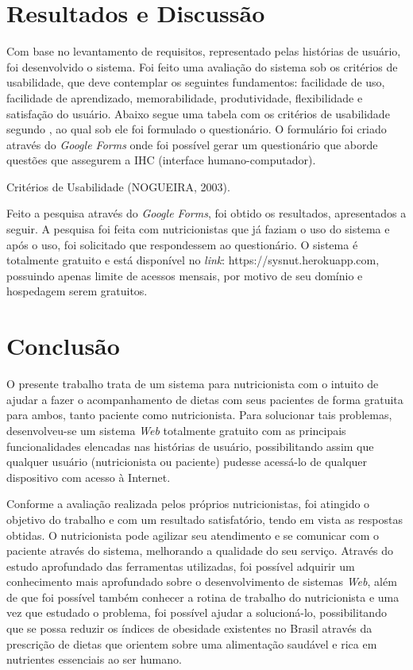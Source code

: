 \documentclass[
	12pt,				%
    oneside,			%
	a4paper,			%
	english,			%
	french,				%
	spanish,			%
	brazil,				%
	]{abntex2}
\begin{document}
\chapter{Resultados e Discussão}

Com base no levantamento de requisitos, representado pelas histórias de usuário, foi desenvolvido o sistema. Foi feito uma avaliação do sistema sob os critérios de usabilidade, que deve contemplar os seguintes fundamentos: facilidade de uso, facilidade de aprendizado, memorabilidade, produtividade, flexibilidade e satisfação do usuário. Abaixo segue uma tabela com os critérios de usabilidade segundo , ao qual sob ele foi formulado o questionário.
O formulário foi criado através do \textit{Google Forms} onde foi possível gerar um questionário que aborde questões que assegurem a IHC (interface humano-computador).

{Critérios de Usabilidade (NOGUEIRA, 2003).}

Feito a pesquisa através do \textit{Google Forms}, foi obtido os resultados, apresentados a seguir. A pesquisa foi feita com nutricionistas que já faziam o uso do sistema e após o uso, foi solicitado que respondessem ao questionário. O sistema é totalmente gratuito e está disponível no \textit{link}: https://sysnut.herokuapp.com, possuindo apenas limite de acessos mensais, por motivo de seu domínio e hospedagem serem gratuitos.


\chapter{Conclusão}

O presente trabalho trata de um sistema para nutricionista com o intuito de ajudar a fazer o acompanhamento de dietas com seus pacientes de forma gratuita para ambos, tanto paciente como nutricionista. 
Para solucionar tais problemas, desenvolveu-se um sistema \textit{Web} totalmente gratuito com as
principais funcionalidades elencadas nas histórias de usuário, possibilitando assim
que qualquer usuário (nutricionista ou paciente) pudesse acessá-lo de qualquer
dispositivo com acesso à Internet.

Conforme a avaliação realizada pelos próprios nutricionistas, foi atingido o objetivo do trabalho e com um resultado satisfatório, tendo em vista as respostas obtidas. O nutricionista pode agilizar seu atendimento e se comunicar com o 
paciente através do sistema, melhorando a qualidade do seu serviço. Através do estudo aprofundado das ferramentas utilizadas, foi possível adquirir um conhecimento mais aprofundado sobre o desenvolvimento de sistemas \textit{Web}, além de que foi possível também conhecer a rotina de trabalho do nutricionista e uma vez que estudado o problema, foi possível ajudar a solucioná-lo, possibilitando que se possa reduzir os índices de obesidade existentes no Brasil através da prescrição de dietas que orientem sobre uma alimentação saudável e rica em nutrientes essenciais ao ser humano.
\end{document}
